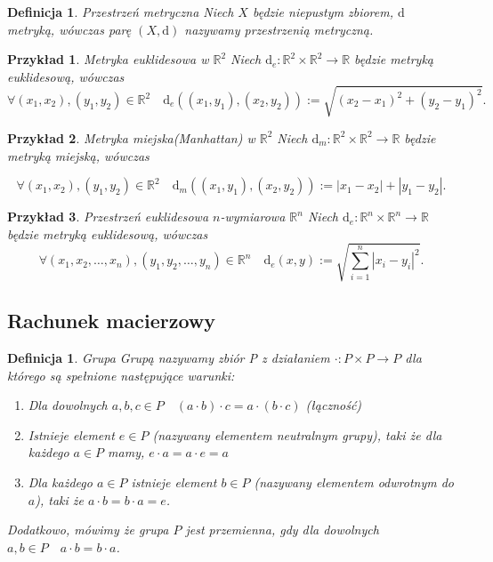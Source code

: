 \documentclass[12pt,a4paper]{report}
\newtheorem{definition}[theorem]{Definicja}
\newtheorem{example}{Przykład}
\begin{document}
\begin{definition}{Przestrzeń metryczna \cite[Rozdział 9]{kuratowski2004}}
Niech $X$ będzie niepustym zbiorem, $\mathrm{d}$ metryką, wówczas parę $(X,\mathrm{d})$ nazywamy przestrzenią metryczną. 
\end{definition}


\begin{example}{Metryka euklidesowa w $\mathbb{R}^2$}
Niech $\mathrm{d}_e: \mathbb{R}^2 \times \mathbb{R}^2 \rightarrow \mathbb{R}$ będzie metryką euklidesową, wówczas
$$\forall{(x_{1},x_{2}),(y_{1},y_{2}) \in \mathbb{R}^2} \quad \mathrm{d}_e((x_1,y_1),(x_2,y_2)):= \sqrt{(x_2-x_1)^2+(y_2-y_1)^2}. $$
\end{example}


\begin{example}{Metryka miejska(Manhattan) w $\mathbb{R}^2$}
Niech $\mathrm{d}_m: \mathbb{R}^2 \times \mathbb{R}^2 \rightarrow \mathbb{R}$ będzie metryką miejską, wówczas 

$$\forall{(x_{1},x_{2}),(y_{1},y_{2}) \in \mathbb{R}^2} \quad \mathrm{d}_m((x_1,y_1),(x_2,y_2)):=|x_1-x_2|+|y_1-y_2|.$$

\end{example}


\begin{example}{Przestrzeń euklidesowa $n$-wymiarowa $\mathbb{R}^n$}
Niech $\mathrm{d}_e: \mathbb{R}^n \times \mathbb{R}^n \rightarrow \mathbb{R}$ będzie metryką euklidesową, wówczas
$$\forall{(x_1,x_2,\ldots,x_n),(y_1,y_2,\ldots,y_n) \in \mathbb{R}^n} \quad \mathrm{d}_e(x,y):= \sqrt{\sum_{i=1}^{n} |x_i-y_i|^2}.$$
\end{example}


\subsection{Rachunek macierzowy}

\begin{definition}{Grupa \cite[Rozdział 0]{banaszak2002}}
Grupą nazywamy zbiór P z działaniem $\cdot: P \times P \rightarrow P$ dla którego są spełnione następujące warunki:
\begin{enumerate}
\item Dla dowolnych $a,b,c \in P \quad (a\cdot b)\cdot c=a \cdot(b\cdot c) $ (łączność)
\item Istnieje element $e \in P$ (nazywany elementem neutralnym grupy), taki że dla każdego $a \in P$ mamy, $e\cdot a=a\cdot e=a$
\item Dla każdego $a \in P$ istnieje element $b\in P$ (nazywany elementem odwrotnym do $a$), taki że $a\cdot b=b \cdot a=e$.
\end{enumerate}
Dodatkowo, mówimy że grupa $P$ jest przemienna, gdy dla dowolnych $a,b\in P \quad a\cdot b=b\cdot a$.
\end{definition}
\end{document}
